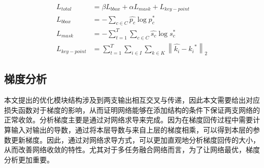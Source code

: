 \begin{align}
L_{total} &= \beta L_{bbox} + \alpha L_{mask} + L_{key-point}\label{detection_loss}\\
L_{bbox} &= -\sum_{c \in C}{\hat{p_c} \log{p_c^{*}}}\label{bbox_loss}\\
L_{mask} &= -\sum_{t=1}^{T}\sum_{c \in C}{\hat{s_c} \log{s_c^{*}}}\label{mask_loss}\\
L_{key-point} &= \sum_{t=1}^{T}\sum_{i \in I}\sum_{k \in K}{\left\| \hat{k_i} - {k_i}^{*} \right\|_2}\label{key-point_loss}
\end{align}

\subsection{梯度分析}
\label{subsec:gradient}
本文提出的优化模块结构涉及到两支输出相互交叉与传递，因此本文需要给出对应损失函数对于梯度的影响，从而证明网络能够在添加结构的条件下保证两支网络的正常收敛。分析梯度主要是通过对网络求导来完成。因为在梯度回传过程中需要计算输入对输出的导数，通过将本层导数与来自上层的梯度相乘，可以得到本层的参数更新梯度。因此，通过对网络求导方式，可以更加直观地分析梯度回传的大小，从而改善网络收敛的特性。尤其对于多任务融合网络而言，为了让网络最优，梯度分析更加重要。

